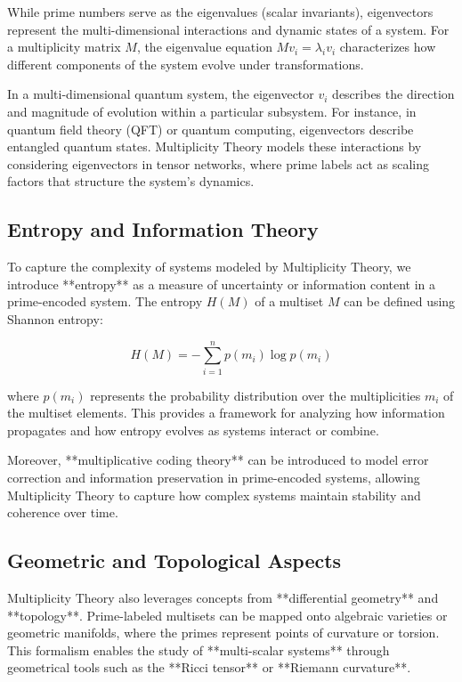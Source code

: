 \documentclass[12pt]{article}
\begin{document}
While prime numbers serve as the eigenvalues (scalar invariants), eigenvectors represent the multi-dimensional interactions and dynamic states of a system. For a multiplicity matrix \( M \), the eigenvalue equation \( M v_i = \lambda_i v_i \) characterizes how different components of the system evolve under transformations.

In a multi-dimensional quantum system, the eigenvector \( v_i \) describes the direction and magnitude of evolution within a particular subsystem. For instance, in quantum field theory (QFT) or quantum computing, eigenvectors describe entangled quantum states. Multiplicity Theory models these interactions by considering eigenvectors in tensor networks, where prime labels act as scaling factors that structure the system’s dynamics.

\subsection{Entropy and Information Theory}

To capture the complexity of systems modeled by Multiplicity Theory, we introduce **entropy** as a measure of uncertainty or information content in a prime-encoded system. The entropy \( H(M) \) of a multiset \( M \) can be defined using Shannon entropy:

$$H(M) = - \sum_{i=1}^{n} p(m_i) \log p(m_i)$$

where \( p(m_i) \) represents the probability distribution over the multiplicities \( m_i \) of the multiset elements. This provides a framework for analyzing how information propagates and how entropy evolves as systems interact or combine.

Moreover, **multiplicative coding theory** can be introduced to model error correction and information preservation in prime-encoded systems, allowing Multiplicity Theory to capture how complex systems maintain stability and coherence over time.

\subsection{Geometric and Topological Aspects}

Multiplicity Theory also leverages concepts from **differential geometry** and **topology**. Prime-labeled multisets can be mapped onto algebraic varieties or geometric manifolds, where the primes represent points of curvature or torsion. This formalism enables the study of **multi-scalar systems** through geometrical tools such as the **Ricci tensor** or **Riemann curvature**.
\end{document}
